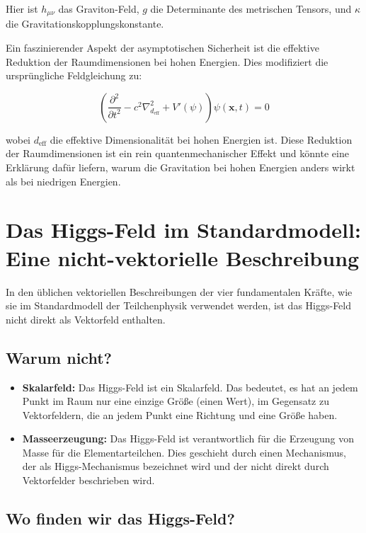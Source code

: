 \documentclass{article}
\begin{document}
Hier ist $h_{\mu\nu}$ das Graviton-Feld, $g$ die Determinante des metrischen Tensors, und $\kappa$ die Gravitationskopplungskonstante.

Ein faszinierender Aspekt der asymptotischen Sicherheit ist die effektive Reduktion der Raumdimensionen bei hohen Energien. Dies modifiziert die ursprüngliche Feldgleichung zu:

\begin{equation}
	\left( \frac{\partial^2}{\partial t^2} - c^2 \nabla^2_{d_\text{eff}} + V'(\psi) \right) \psi(\mathbf{x},t) = 0
\end{equation}

wobei $d_\text{eff}$ die effektive Dimensionalität bei hohen Energien ist. Diese Reduktion der Raumdimensionen ist ein rein quantenmechanischer Effekt und könnte eine Erklärung dafür liefern, warum die Gravitation bei hohen Energien anders wirkt als bei niedrigen Energien.	

\section{Das Higgs-Feld im Standardmodell: Eine nicht-vektorielle Beschreibung}

In den üblichen vektoriellen Beschreibungen der vier fundamentalen Kräfte, wie sie im Standardmodell der Teilchenphysik verwendet werden, ist das Higgs-Feld nicht direkt als Vektorfeld enthalten.

\subsection*{Warum nicht?}

\begin{itemize}
	\item \textbf{Skalarfeld:} Das Higgs-Feld ist ein Skalarfeld. Das bedeutet, es hat an jedem Punkt im Raum nur eine einzige Größe (einen Wert), im Gegensatz zu Vektorfeldern, die an jedem Punkt eine Richtung und eine Größe haben.
	\item \textbf{Masseerzeugung:} Das Higgs-Feld ist verantwortlich für die Erzeugung von Masse für die Elementarteilchen. Dies geschieht durch einen Mechanismus, der als Higgs-Mechanismus bezeichnet wird und der nicht direkt durch Vektorfelder beschrieben wird.
\end{itemize}

\subsection*{Wo finden wir das Higgs-Feld?}
\end{document}
